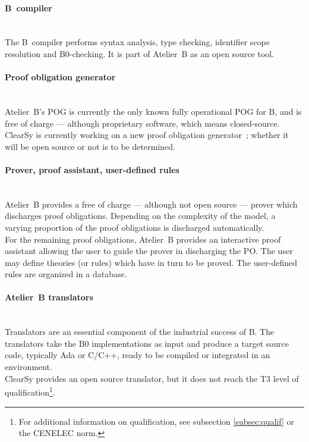 \documentclass{article}
\begin{document}
\paragraph{B~compiler}~\\
The B~compiler performs syntax analysis, type checking, identifier scope resolution and B0-checking. It is part of Atelier~B as an open source tool.

\paragraph{Proof obligation generator}~\\
Atelier~B's POG is currently the only known fully operational POG for B, and is free of charge --- although proprietary software, which means closed-source. ClearSy is currently working on a new proof obligation generator~; whether it will be open source or not is to be determined.

\paragraph{Prover, proof assistant, user-defined rules}~\\
Atelier~B provides a free of charge --- although not open source --- prover which discharges proof obligations. Depending on the complexity of the model, a varying proportion of the proof obligations is discharged automatically.\\
For the remaining proof obligations, Atelier~B provides an interactive proof assistant allowing the user to guide the prover in discharging the PO. The user may define theories (or rules) which have in turn to be proved. The user-defined rules are organized in a database. 

\paragraph{Atelier~B translators}~\\
Translators are an essential component of the industrial success of B. The translators take the B0 implementations as input and produce a target source code, typically Ada or C/C++, ready to be compiled or integrated in an environment.\\
ClearSy provides an open source translator, but it does not reach the T3 level of qualification\footnote{For additional information on qualification, see subsection \ref{subsec:qualif} or the CENELEC norm.}.
\end{document}
